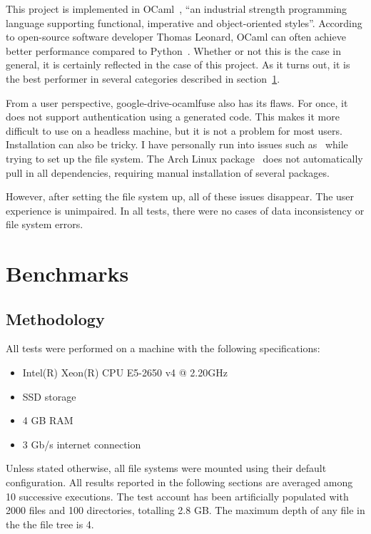 This project is implemented in OCaml~\cite{ocaml-website}, ``an industrial strength programming language supporting functional, imperative and object-oriented styles''. According to open-source software developer Thomas Leonard, OCaml can often achieve better performance compared to Python~\cite{python_to_ocaml_retrospective}. Whether or not this is the case in general, it is certainly reflected in the case of this project. As it turns out, it is the best performer in several categories described in section~\ref{benchmarks}.

From a user perspective, google-drive-ocamlfuse also has its flaws. For once, it does not support authentication using a generated code. This makes it more difficult to use on a headless machine, but it is not a problem for most users. Installation can also be tricky. I have personally run into issues such as~\cite{opam-depext-issue} while trying to set up the file system. The Arch Linux package~\cite{google-drive-ocamlfuse-aur} does not automatically pull in all dependencies, requiring manual installation of several packages.

However, after setting the file system up, all of these issues disappear. The user experience is unimpaired. In all tests, there were no cases of data inconsistency or file system errors.

\section{Benchmarks} \label{benchmarks}

\subsection{Methodology}

All tests were performed on a machine with the following specifications:

\begin{itemize}
  \setlength\itemsep{-0.4em}
  \item Intel(R) Xeon(R) CPU E5-2650 v4 @ 2.20GHz
  \item SSD storage
  \item 4 GB RAM
  \item 3 Gb/s internet connection
\end{itemize}

Unless stated otherwise, all file systems were mounted using their default configuration. All results reported in the following sections are averaged among 10 successive executions. The test account has been artificially populated with 2000 files and 100 directories, totalling 2.8 GB. The maximum depth of any file in the the file tree is 4.

